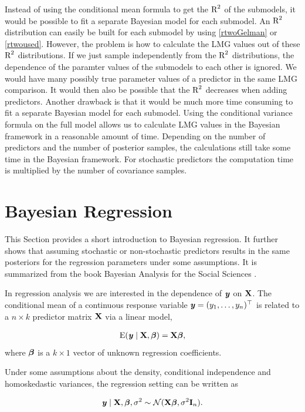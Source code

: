 \documentclass[11pt,a4paper,twoside]{book}\usepackage[]{graphicx}\usepackage[]{color}
\begin{document}
Instead of using the conditional mean formula to get the $\text{R}^2$ of the submodels,  it would be possible to fit a separate Bayesian model for each submodel. An $\text{R}^2$ distribution can easily be built for each submodel by using \eqref{rtwoGelman} or  \eqref{rtwoused}. However, the problem is how to calculate the LMG values out of these $\text{R}^2$ distributions. If we just sample independently from the $\text{R}^2$ distributions, the dependence of the paramter values of the submodels to each other is ignored. We would have many possibly true parameter values of a predictor in the same LMG comparison. It would then also be possible that the $\text{R}^2$ decreases when adding predictors.  Another drawback is that it would be much more time consuming to fit a separate Bayesian model for each submodel. Using the conditional variance formula on the full model allows us to calculate LMG values in the Bayesian framework in a reasonable amount of time. Depending on the number of predictors and the number of posterior samples, the calculations still take some time in the Bayesian framework. For stochastic predictors the computation time is multiplied by the number of covariance samples.


\section{Bayesian Regression}
This Section provides a short introduction to Bayesian regression. It further shows that assuming stochastic or non-stochastic predictors results in the same posteriors for the regression parameters under some assumptions.  It is summarized from the book Bayesian Analysis for the Social Sciences \citep{Jackman2009}. 

In regression analysis we are interested in the dependence of ${\textbf{\textit{y}}}$ on ${\mathbf{X}}$. The conditional mean of a continuous response variable ${\textbf{\textit{y}}} = (y_{1}, \dots, y_{n})^\top$ is related to a $n \times k$ predictor matrix ${\mathbf{X}}$ via a linear model, 

       \begin{align*} 
\operatorname{E}({\textbf{\textit{y}}} \mid {\mathbf{X}} , {\boldsymbol{\beta}}) = {\mathbf{X}} {\boldsymbol{\beta}} ,
   \end{align*}
where ${\boldsymbol{\beta}}$ is a $k \times 1$ vector of unknown regression coefficients.

Under some assumptions about the density, conditional independence and homoskedastic variances, the regression setting can be written as

       \begin{align*} 
{\textbf{\textit{y}}} \mid {\mathbf{X}} , {\boldsymbol{\beta}}, \sigma^2 \sim \mathcal{N}({\mathbf{X}} {\boldsymbol{\beta}} , \sigma^2 {\mathbf{I}}_{n}) \text{.}
   \end{align*}
\end{document}
